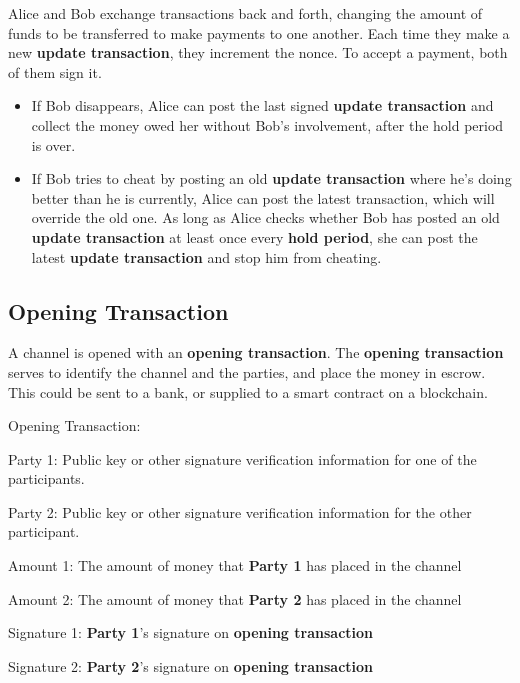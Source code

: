 \documentclass[a4paper]{article}
\newcommand{\bgls}[1]{\textbf{\gls{#1}}}
\newenvironment{mydescription}
{\begin{description}
  \setlength{\itemsep}{5pt}
    \setlength{\parskip}{0pt}
    \setlength{\labelsep}{5pt}
}{
\end{description}}
\begin{document}
Alice and Bob exchange transactions back and forth, changing the amount of funds to be transferred to make payments to one another. Each time they make a new \bgls{update transaction}, they increment the nonce. To accept a payment, both of them sign it.

\begin{itemize}
  \item If Bob disappears, Alice can post the last signed \bgls{update transaction} and collect the money owed her without Bob's involvement, after the hold period is over.

  \item If Bob tries to cheat by posting an old \bgls{update transaction} where he's doing better than he is currently, Alice can post the latest transaction, which will override the old one. As long as Alice checks whether Bob has posted an old \bgls{update transaction} at least once every \bgls{hold period}, she can post the latest \bgls{update transaction} and stop him from cheating.
\end{itemize}


\subsection{Opening Transaction}

A channel is opened with an \bgls{opening transaction}. The \bgls{opening transaction} serves to identify the channel and the parties, and place the money in escrow. This could be sent to a bank, or supplied to a smart contract on a blockchain.

\begin{mdframed}[style=message]
  \begin{mydescription}
  \item[Opening Transaction:] \hfill
    \begin{mydescription}
    \item[Party 1:] Public key or other signature verification information for one of the participants.
    \item[Party 2:] Public key or other signature verification information for the other participant.
    \item[Amount 1:] The amount of money that \textbf{Party 1} has placed in the channel
    \item[Amount 2:] The amount of money that \textbf{Party 2} has placed in the channel
    \end{mydescription}
  \item[Signature 1:] \textbf{Party 1}'s signature on \bgls{opening transaction}
  \item[Signature 2:] \textbf{Party 2}'s signature on \bgls{opening transaction}
  \end{mydescription}
\end{mdframed}
\end{document}
